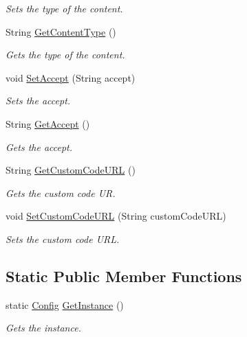 \begin{DoxyCompactItemize}
\begin{DoxyCompactList}\small\item\em Sets the type of the content. \end{DoxyCompactList}\item 
String \hyperlink{classcom_1_1shephertz_1_1app42_1_1paas_1_1sdk_1_1csharp_1_1_config_a4ce072fb37bbdef50cb17256e684b675}{Get\+Content\+Type} ()
\begin{DoxyCompactList}\small\item\em Gets the type of the content. \end{DoxyCompactList}\item 
void \hyperlink{classcom_1_1shephertz_1_1app42_1_1paas_1_1sdk_1_1csharp_1_1_config_a4f5ca128be8a053bfdbda159157410ad}{Set\+Accept} (String accept)
\begin{DoxyCompactList}\small\item\em Sets the accept. \end{DoxyCompactList}\item 
String \hyperlink{classcom_1_1shephertz_1_1app42_1_1paas_1_1sdk_1_1csharp_1_1_config_ab7c89e231da2103b512e995656fc24c5}{Get\+Accept} ()
\begin{DoxyCompactList}\small\item\em Gets the accept. \end{DoxyCompactList}\item 
String \hyperlink{classcom_1_1shephertz_1_1app42_1_1paas_1_1sdk_1_1csharp_1_1_config_a3324382d96ba5709126f58563a4bbfe8}{Get\+Custom\+Code\+U\+R\+L} ()
\begin{DoxyCompactList}\small\item\em Gets the custom code U\+R. \end{DoxyCompactList}\item 
void \hyperlink{classcom_1_1shephertz_1_1app42_1_1paas_1_1sdk_1_1csharp_1_1_config_a4dce34e23e3a23c271952e8d4b3b6618}{Set\+Custom\+Code\+U\+R\+L} (String custom\+Code\+U\+R\+L)
\begin{DoxyCompactList}\small\item\em Sets the custom code U\+R\+L. \end{DoxyCompactList}\end{DoxyCompactItemize}
\subsection*{Static Public Member Functions}
\begin{DoxyCompactItemize}
\item 
static \hyperlink{classcom_1_1shephertz_1_1app42_1_1paas_1_1sdk_1_1csharp_1_1_config}{Config} \hyperlink{classcom_1_1shephertz_1_1app42_1_1paas_1_1sdk_1_1csharp_1_1_config_a638691f46423dcfb029210ff0ef897b0}{Get\+Instance} ()
\begin{DoxyCompactList}\small\item\em Gets the instance. \end{DoxyCompactList}\end{DoxyCompactItemize}


